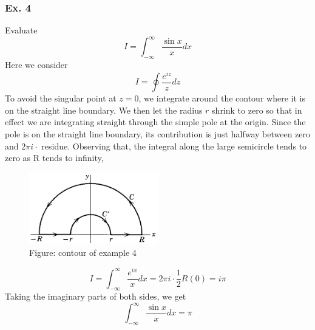 \documentclass[../../../main.tex]{subfiles}
\begin{document}
\subsubsection{Ex. 4} Evaluate
\begin{equation*}
    I=\int_{-\infty}^{\infty}\frac{\sin x}{x}dx
\end{equation*}
Here we consider
\begin{equation*}
    I=\oint \frac{e^{iz}}{z}dz
\end{equation*}
To avoid the singular point at $z = 0$, we integrate around the contour where it is on the straight line boundary. We then let the radius $r$ shrink to zero so that in effect we are integrating straight through the simple pole at the origin. Since the pole is on the straight line boundary, its contribution is just 
halfway between zero and $2\pi i\cdot$ residue.  Observing that, the integral along the large semicircle tends to zero as R tends to inﬁnity,
\begin{figure}[b]
    \centering
    \includegraphics[width=0.5\textwidth]{../../../Rss/AnalyticsApproach/Com/Residue2.png}
    \caption*{Figure: contour of example 4}
\end{figure}
\begin{equation*}
    I=\int_{-\infty}^{\infty} \frac{e^{ix}}{x}dx=2\pi i\cdot\frac{1}{2}R(0)=i\pi
\end{equation*}
Taking the imaginary parts of both sides, we get
\begin{equation*}
    \int_{-\infty}^{\infty} \frac{\sin x}{x}dx=\pi
\end{equation*}
\end{document}
